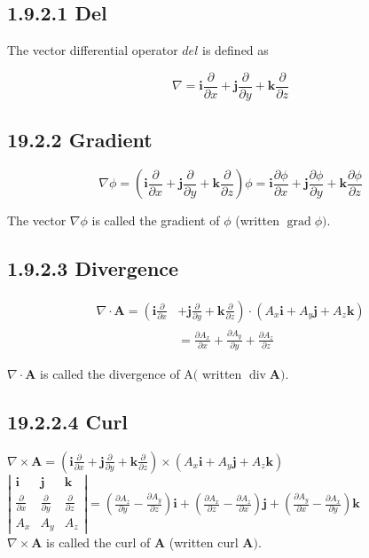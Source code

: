 \documentclass[10pt]{article}
\begin{document}
\subsection*{1.9.2.1 Del}
The vector differential operator $d e l$ is defined as

$$
\nabla=\mathbf{i} \frac{\partial}{\partial x}+\mathbf{j} \frac{\partial}{\partial y}+\mathbf{k} \frac{\partial}{\partial z}
$$

\subsection*{19.2.2 Gradient}
$$
\nabla \phi=\left(\mathbf{i} \frac{\partial}{\partial x}+\mathbf{j} \frac{\partial}{\partial y}+\mathbf{k} \frac{\partial}{\partial z}\right) \phi=\mathbf{i} \frac{\partial \phi}{\partial x}+\mathbf{j} \frac{\partial \phi}{\partial y}+\mathbf{k} \frac{\partial \phi}{\partial z}
$$

The vector $\nabla \phi$ is called the gradient of $\phi$ (written $\operatorname{grad} \phi)$.

\subsection*{1.9.2.3 Divergence}
$$
\begin{aligned}
\nabla \cdot \mathbf{A}=\left(\mathbf{i} \frac{\partial}{\partial x}\right. & \left.+\mathbf{j} \frac{\partial}{\partial y}+\mathbf{k} \frac{\partial}{\partial z}\right) \cdot\left(A_{x} \mathbf{i}+A_{y} \mathbf{j}+A_{z} \mathbf{k}\right) \\
& =\frac{\partial A_{x}}{\partial x}+\frac{\partial A_{y}}{\partial y}+\frac{\partial A_{z}}{\partial z}
\end{aligned}
$$

$\nabla \cdot \mathbf{A}$ is called the divergence of $\mathrm{A}($ written $\operatorname{div} \mathbf{A})$.

\subsection*{19.2.2.4 Curl}
$\nabla \times \mathbf{A}=\left(\mathbf{i} \frac{\partial}{\partial x}+\mathbf{j} \frac{\partial}{\partial y}+\mathbf{k} \frac{\partial}{\partial z}\right) \times\left(A_{x} \mathbf{i}+A_{y} \mathbf{j}+A_{z} \mathbf{k}\right)$\\
$\left|\begin{array}{lll}\mathbf{i} & \mathbf{j} & \mathbf{k} \\ \frac{\partial}{\partial x} & \frac{\partial}{\partial y} & \frac{\partial}{\partial z} \\ A_{x} & A_{y} & A_{z}\end{array}\right|=\left(\frac{\partial A_{z}}{\partial y}-\frac{\partial A_{y}}{\partial z}\right) \mathbf{i}+\left(\frac{\partial A_{x}}{\partial z}-\frac{\partial A_{z}}{\partial x}\right) \mathbf{j}+\left(\frac{\partial A_{y}}{\partial x}-\frac{\partial A_{x}}{\partial y}\right) \mathbf{k}$\\
$\nabla \times \mathbf{A}$ is called the curl of $\mathbf{A}$ (written curl $\mathbf{A})$.
\end{document}
